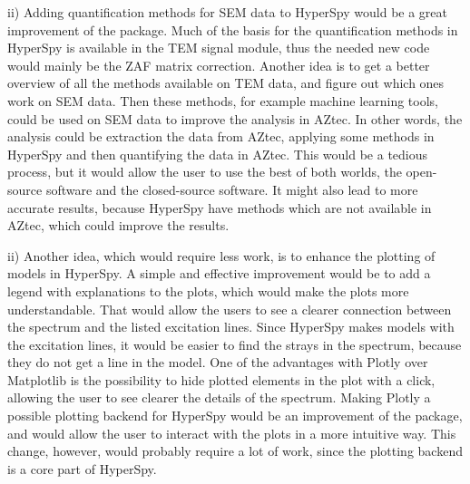 ii) Adding quantification methods for SEM data to HyperSpy would be a great improvement of the package.
Much of the basis for the quantification methods in HyperSpy is available in the TEM signal module, thus the needed new code would mainly be the ZAF matrix correction.
Another idea is to get a better overview of all the methods available on TEM data, and figure out which ones work on SEM data.
Then these methods, for example machine learning tools, could be used on SEM data to improve the analysis in AZtec.
In other words, the analysis could be extraction the data from AZtec, applying some methods in HyperSpy and then quantifying the data in AZtec.
This would be a tedious process, but it would allow the user to use the best of both worlds, the open-source software and the closed-source software.
It might also lead to more accurate results, because HyperSpy have methods which are not available in AZtec, which could improve the results.

ii) Another idea, which would require less work, is to enhance the plotting of models in HyperSpy.
A simple and effective improvement would be to add a legend with explanations to the plots, which would make the plots more understandable.
That would allow the users to see a clearer connection between the spectrum and the listed excitation lines.
Since HyperSpy makes models with the excitation lines, it would be easier to find the strays in the spectrum, because they do not get a line in the model.
One of the advantages with Plotly over Matplotlib is the possibility to hide plotted elements in the plot with a click, allowing the user to see clearer the details of the spectrum.
Making Plotly a possible plotting backend for HyperSpy would be an improvement of the package, and would allow the user to interact with the plots in a more intuitive way.
This change, however, would probably require a lot of work, since the plotting backend is a core part of HyperSpy.


